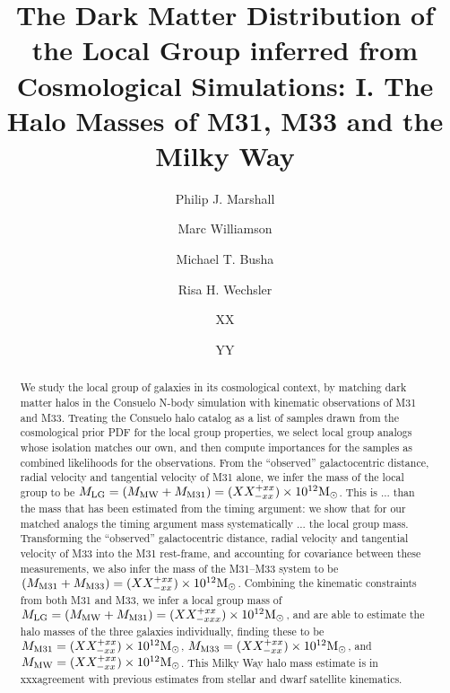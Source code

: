 \documentclass{emulateapj}
\newcommand{\MMW}{{\rm M}_{\rm MW}}
\newcommand{\Msun}{{\rm M}_\odot}
\newcommand{\consuelo}{{\sc Consuelo }}
\def\MLG{M_{\rm LG}}
\def\MMW{M_{\rm MW}}
\def\MEI{M_{\rm M31}}
\def\MEE{M_{\rm M33}}
\def\MPAIRestimate{XX}
\def\MPAIRerrorplus{xx}
\def\MPAIRerrorminus{xx}
\def\MbAestimate{XX}
\def\MbAerrorplus{xx}
\def\MbAerrorminus{xx}
\def\MTRIPLETestimate{XX}
\def\MTRIPLETerrorplus{xx}
\def\MTRIPLETerrorminus{xxx}
\def\MEIestimate{XX}
\def\MEIerrorplus{xx}
\def\MEIerrorminus{xx}
\def\MEEestimate{XX}
\def\MEEerrorplus{xx}
\def\MEEerrorminus{xx}
\def\MMWestimate{XX}
\def\MMWerrorplus{xx}
\def\MMWerrorminus{xx}
\begin{document}
\title{The Dark Matter Distribution of the Local Group inferred from
Cosmological Simulations: I. The Halo Masses of M31, M33 and the Milky Way}

\author{Philip J. Marshall}
\author{Marc Williamson}
\author{Michael T. Busha} 
\author{Risa H. Wechsler}
\author{XX}
\author{YY}


\begin{abstract} 

We study the local group of galaxies in its cosmological context, by matching
dark matter halos in the \consuelo N-body simulation with kinematic
observations of M31 and M33. Treating the \consuelo halo  catalog as a list of
samples drawn from the cosmological prior PDF for the local group properties,
we select local group analogs whose isolation matches our own, and then
compute importances for the samples as combined likelihoods for the
observations. 
%
From the ``observed'' galactocentric distance, radial velocity and tangential 
velocity of M31 alone, we infer the mass of the local group to be $\MLG =
(\MMW + \MEI) = (\MPAIRestimate^{+\MPAIRerrorplus}_{-\MPAIRerrorminus}) \times
10^{12} \Msun$. This is ... than the mass that has been estimated from the
timing argument: we show that for our matched analogs the timing argument mass
systematically ... the local group mass. 
%
Transforming the ``observed'' galactocentric distance, radial velocity and
tangential  velocity of M33 into the M31 rest-frame, and accounting for
covariance between these measurements, we also infer the mass of the M31--M33
system to be  $(\MEI + \MEE) =
(\MbAestimate^{+\MbAerrorplus}_{-\MbAerrorminus}) \times 10^{12} \Msun$.
%
Combining the kinematic constraints from both M31 and M33,  we infer a local
group mass of $\MLG = (\MMW + \MEI) =
(\MTRIPLETestimate^{+\MTRIPLETerrorplus}_{-\MTRIPLETerrorminus}) \times
10^{12} \Msun$, and are able to estimate the halo masses of the three galaxies
individually, finding these to be $\MEI =
(\MEIestimate^{+\MEIerrorplus}_{-\MEIerrorminus}) \times 10^{12} \Msun$, $\MEE
= (\MEEestimate^{+\MEEerrorplus}_{-\MEEerrorminus}) \times 10^{12} \Msun$, 
and $\MMW = (\MMWestimate^{+\MMWerrorplus}_{-\MMWerrorminus}) \times 10^{12}
\Msun$. 
%
This Milky Way halo mass estimate is in xxxagreement with previous estimates
from stellar and dwarf satellite kinematics.

\end{abstract}
\end{document}
